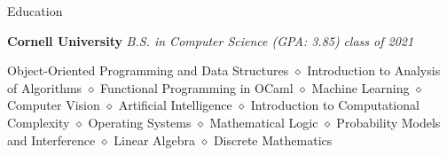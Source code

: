 \documentclass{resume} %
\date{\specialdate\today}
\begin{document}






\begin{rSection}{Education}

{\bf Cornell University} \textit{B.S. in Computer Science (GPA: 3.85)}  \hfill {\em class of 2021}
\item Object-Oriented Programming and Data Structures $\diamond$  Introduction to Analysis of Algorithms $\diamond$ Functional Programming in OCaml $\diamond$ Machine Learning $\diamond$ Computer Vision $\diamond$ Artificial Intelligence $\diamond$ Introduction to Computational Complexity $\diamond$ Operating Systems $\diamond$ Mathematical Logic $\diamond$ Probability Models and Interference $\diamond$ Linear Algebra $\diamond$ Discrete Mathematics

\end{rSection}






\end{document}
